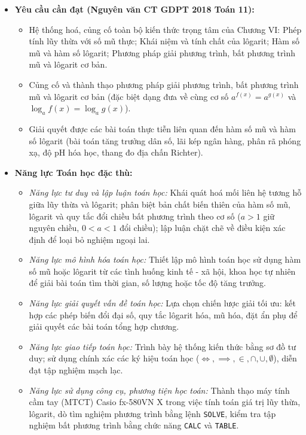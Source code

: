 \documentclass[12pt, a4paper]{article}
\begin{document}
\begin{itemize}[leftmargin=1.2cm]
    \item \textbf{Yêu cầu cần đạt (Nguyên văn CT GDPT 2018 Toán 11):}
    \begin{itemize}[leftmargin=0.6cm]
        \item Hệ thống hoá, củng cố toàn bộ kiến thức trọng tâm của Chương VI: Phép tính lũy thừa với số mũ thực; Khái niệm và tính chất của lôgarit; Hàm số mũ và hàm số lôgarit; Phương pháp giải phương trình, bất phương trình mũ và lôgarit cơ bản.
        \item Củng cố và thành thạo phương pháp giải phương trình, bất phương trình mũ và lôgarit cơ bản (đặc biệt dạng đưa về cùng cơ số $a^{f(x)} = a^{g(x)}$ và $\log_a f(x) = \log_a g(x)$).
        \item Giải quyết được các bài toán thực tiễn liên quan đến hàm số mũ và hàm số lôgarit (bài toán tăng trưởng dân số, lãi kép ngân hàng, phân rã phóng xạ, độ pH hóa học, thang đo địa chấn Richter).
    \end{itemize}

    \item \textbf{Năng lực Toán học đặc thù:}
    \begin{itemize}[leftmargin=0.6cm]
        \item \textit{Năng lực tư duy và lập luận toán học:} Khái quát hoá mối liên hệ tương hỗ giữa lũy thừa và lôgarit; phân biệt bản chất biến thiên của hàm số mũ, lôgarit và quy tắc đổi chiều bất phương trình theo cơ số ($a > 1$ giữ nguyên chiều, $0 < a < 1$ đổi chiều); lập luận chặt chẽ về điều kiện xác định để loại bỏ nghiệm ngoại lai.
        \item \textit{Năng lực mô hình hóa toán học:} Thiết lập mô hình toán học sử dụng hàm số mũ hoặc lôgarit từ các tình huống kinh tế - xã hội, khoa học tự nhiên để giải bài toán tìm thời gian, số lượng hoặc tốc độ tăng trưởng.
        \item \textit{Năng lực giải quyết vấn đề toán học:} Lựa chọn chiến lược giải tối ưu: kết hợp các phép biến đổi đại số, quy tắc lôgarit hóa, mũ hóa, đặt ẩn phụ để giải quyết các bài toán tổng hợp chương.
        \item \textit{Năng lực giao tiếp toán học:} Trình bày hệ thống kiến thức bằng sơ đồ tư duy; sử dụng chính xác các ký hiệu toán học ($\iff, \implies, \in, \cap, \cup, \emptyset$), diễn đạt tập nghiệm mạch lạc.
        \item \textit{Năng lực sử dụng công cụ, phương tiện học toán:} Thành thạo máy tính cầm tay (MTCT) Casio fx-580VN X trong việc tính toán giá trị lũy thừa, lôgarit, dò tìm nghiệm phương trình bằng lệnh \texttt{SOLVE}, kiểm tra tập nghiệm bất phương trình bằng chức năng \texttt{CALC} và \texttt{TABLE}.
    \end{itemize}


\end{itemize}
\end{document}
